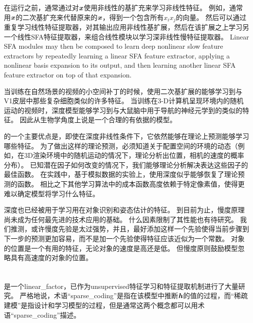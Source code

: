 在运行之前，通常通过对$\boldsymbol{\mathit{x}}$使用非线性的基扩充来学习非线性特征。
例如，通常用$\boldsymbol{\mathit{x}}$的二次基扩充来代替原来的$\boldsymbol{\mathit{x}}$，得到一个包含所有$x_ix_j$的向量。
然后可以通过重复学习线性特征提取器，对其输出应用非线性基扩展，然后在该扩展之上学习另一个线性SFA特征提取器，来组合线性模块以学习深非线性慢特征提取器。
Linear SFA modules may then be composed to learn deep nonlinear slow feature extractors by repeatedly learning a linear SFA feature extractor, applying a nonlinear basis expansion to its output, and then learning another linear SFA feature extractor on top of that expansion.


当训练在自然场景的视频的小空间补丁的时候，使用二次基扩展的能够学习到与V1皮层中那些复杂细胞类似的许多特征\citep{Berkes-Wiskott-2005}。
当训练在3-D计算机呈现环境内的随机运动的视频时，深度模型能够学习到与大鼠脑中用于导航的神经元学到的类似的特征\citep{franzius2007slowness}。
因此从生物学角度上说是一个合理的有依据的模型。



的一个主要优点是，即使在深度非线性条件下，它依然能够在理论上预测能够学习哪些特征。
为了做出这样的理论预测，必须知道关于配置空间的环境的动态（例如，在3D渲染环境中的随机运动的情况下，理论分析出位置，相机的速度的概率分布）。
已知潜在因子如何改变的情况下，我们能够理论分析解决表达这些因子的最佳函数。
在实践中，基于模拟数据的实验上，使用深度似乎能够恢复了理论预测的函数。
相比之下其他学习算法中的成本函数高度依赖于特定像素值，使得更难以确定模型将学习什么特征。


深度也已经被用于学习用在对象识别和姿态估计的特征\citep{Franzius2008}。
到目前为止，慢度原理尚未成为任何最先进的技术应用的基础。
什么因素限制了其性能也有待研究。
我们推测，或许慢度先验是太过强势，并且，最好添加这样一个先验使得当前步骤到下一步的预测更加容易，而不是加一个先验使得特征应该近似为一个常数。
对象的位置是一个有用的特征，无论对象的速度是高还是低。 但慢度原则鼓励模型忽略具有高速度的对象的位置。


\section{}
\label{sec:sparse_coding}


\citep{Olshausen+Field-1996}是一个\gls{linear_factor}，已作为\gls{unsupervised}特征学习和特征提取机制进行了大量研究。
严格地说，术语``\gls{sparse_coding}''是指在该模型中推断$\boldsymbol{\mathit{h}}$的值的过程，而``稀疏建模''是指设计和学习模型的过程，但是通常这两个概念都可以用术语``\gls{sparse_coding}''描述。

